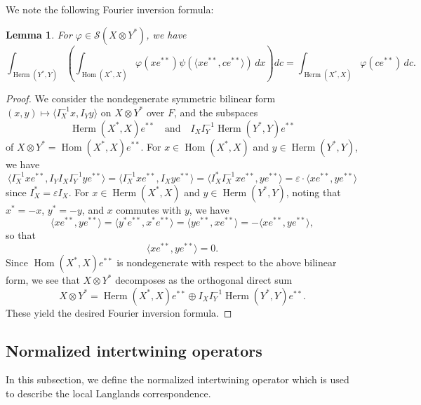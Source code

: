 \documentclass[11pt]{amsart}
\numberwithin{equation}{section}
\theoremstyle{plain}
\newtheorem{lem}[thm]{Lemma}
\theoremstyle{definition}
\theoremstyle{remark}
\def\Herm{\operatorname{Herm}}
\def\Hom{\operatorname{Hom}}
\def\s{\mathscr{S}}
\begin{document}
We note the following Fourier inversion formula:

\begin{lem}
\label{L:fi}
For $\varphi \in \s(X \otimes Y^*)$, we have
\[
 \int_{\Herm(Y^*,Y)} \left( \int_{\Hom(X^*,X)}
 \varphi(x e^{**}) \psi( \langle x e^{**}, c e^{**} \rangle) \, d x \right) d c
 = \int_{\Herm(X^*,X)} \varphi(c e^{**}) \, d c.
\]
\end{lem}

\begin{proof}
We consider the nondegenerate symmetric bilinear form $(x, y) \mapsto \langle I_X^{-1} x, I_Y y \rangle$ on $X \otimes Y^*$ over $F$, and the subspaces 
\[
 \Herm(X^*, X) e^{**} \quad \text{and} \quad I_X I_Y^{-1} \Herm(Y^*, Y) e^{**}
\]
of $X \otimes Y^* = \Hom(X^*, X) e^{**}$.
For $x \in \Hom(X^*, X)$ and $y \in \Herm(Y^*, Y)$, we have
\[
 \langle I_X^{-1} x e^{**}, I_Y I_X I_Y^{-1} y e^{**} \rangle
 = \langle I_X^{-1} x e^{**}, I_X y e^{**} \rangle
 = \langle I_X^* I_X^{-1} x e^{**}, y e^{**} \rangle
 = \varepsilon \cdot \langle x e^{**}, y e^{**} \rangle
\]
since $I_X^* = \varepsilon I_X$.
For $x \in \Herm(X^*, X)$ and $y \in \Herm(Y^*, Y)$, 
noting that $x^* = -x$, $y^* = -y$, and $x$ commutes with $y$, we have
\[
 \langle x e^{**}, y e^{**} \rangle
 = \langle y^* e^{**}, x^* e^{**} \rangle
 = \langle y e^{**}, x e^{**} \rangle
 = - \langle x e^{**}, y e^{**} \rangle, 
\]
so that
\[
\langle x e^{**}, y e^{**} \rangle = 0. 
\]
Since $\Hom(X^*, X) e^{**}$ is nondegenerate with respect to the above bilinear form,
we see that $X \otimes Y^*$ decomposes as the orthogonal direct sum
\[
 X \otimes Y^* = \Herm(X^*, X) e^{**} \oplus I_X I_Y^{-1} \Herm(Y^*, Y) e^{**}.
\]
These yield the desired Fourier inversion formula.
\end{proof}

\subsection{Normalized intertwining operators}
\label{SS:normalization}

In this subsection, we define the normalized intertwining operator which is used to describe the local Langlands correspondence.
\end{document}
